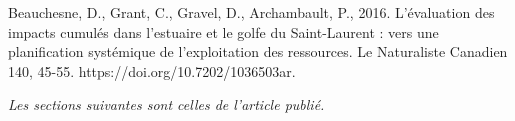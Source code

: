 \begin{singlespace}
  Beauchesne, D., Grant, C., Gravel, D., Archambault, P., 2016. L'évaluation des impacts cumulés dans l'estuaire et le golfe du Saint-Laurent : vers une planification systémique de l'exploitation des ressources. Le Naturaliste Canadien 140, 45-55. https://doi.org/10.7202/1036503ar.
\end{singlespace}

\textit{Les sections suivantes sont celles de l'article publié.}
